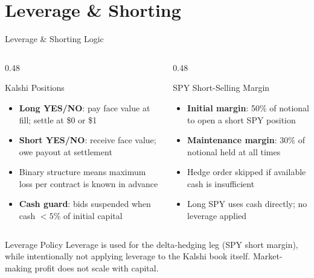 \documentclass[aspectratio=169]{beamer}
\begin{document}
\section{Leverage \& Shorting}

\begin{frame}[shrink=5]{Leverage \& Shorting Logic}
  \begin{columns}[T,onlytextwidth]
    \begin{column}{0.48\textwidth}
      \begin{block}{Kalshi Positions}
        \begin{itemize}\small
          \item \textbf{Long YES/NO}: pay face value at fill; settle at \$0 or \$1
          \item \textbf{Short YES/NO}: receive face value; owe payout at settlement
          \item Binary structure means maximum loss per contract is known in advance
          \item \textbf{Cash guard}: bids suspended when cash $< 5\%$ of initial capital
        \end{itemize}
      \end{block}
    \end{column}
    \begin{column}{0.48\textwidth}
      \begin{block}{SPY Short-Selling Margin}
        \begin{itemize}\small
          \item \textbf{Initial margin}: 50\% of notional to open a short SPY position
          \item \textbf{Maintenance margin}: 30\% of notional held at all times
          \item Hedge order skipped if available cash is insufficient
          \item Long SPY uses cash directly; no leverage applied
        \end{itemize}
      \end{block}
    \end{column}
  \end{columns}
  \vspace{0.2em}
  \begin{alertblock}{Leverage Policy}
    \small Leverage is used for the delta-hedging leg (SPY short margin), while intentionally not applying leverage to the Kalshi book itself. Market-making profit does not scale with capital.
  \end{alertblock}
\end{frame}
\end{document}
